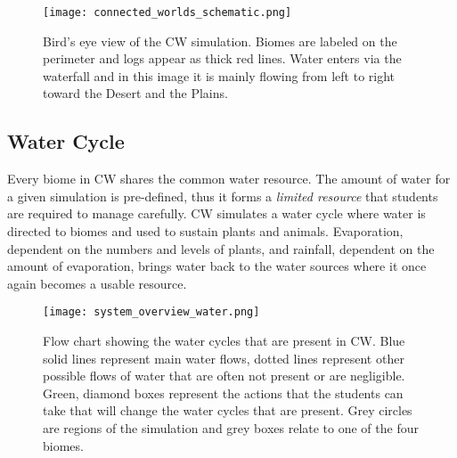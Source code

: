 \begin{figure}
\centering
\texttt{[image: connected\_worlds\_schematic.png]}
\caption{Bird's eye view of the CW simulation. Biomes are labeled on the perimeter and logs appear as thick red lines. Water enters via the waterfall and in this image it is mainly flowing from left to right toward the Desert and the Plains.}
\label{fig:connected_worlds_graphic}
\end{figure}




\subsection{Water Cycle}
Every biome in CW shares the common water resource. The amount of water for a given simulation is pre-defined, thus it forms a \textit{limited resource} that students are required to manage carefully. CW simulates a water cycle where water is directed to biomes and used to sustain plants and animals. Evaporation, dependent on the numbers and levels of plants, and rainfall, dependent on the amount of evaporation, brings water back to the water sources where it once again becomes a usable resource.

\begin{figure}
\centering
\texttt{[image: system\_overview\_water.png]}
\caption{Flow chart showing the water cycles that are present in CW. Blue solid lines represent main water flows, dotted lines represent other possible flows of water that are often not present or are negligible. Green, diamond boxes represent the actions that the students can take that will change the water cycles that are present. Grey circles are regions of the simulation and grey boxes relate to one of the four biomes.}
\label{fig:system_overview_water}
\end{figure}

